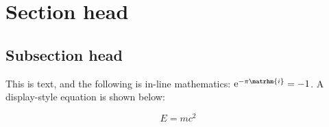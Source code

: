 \documentclass[12pt]{article}
\begin{document}
\section{Section head}
\subsection{Subsection head}

 This is text, and the following is in-line mathematics:
 $\mathrm{e}^{-\pi\matrhm{i}} = -1$.
 A display-style equation is shown below:

 \begin{equation}
   E = mc^2
 \end{equation}

 
\end{document}
